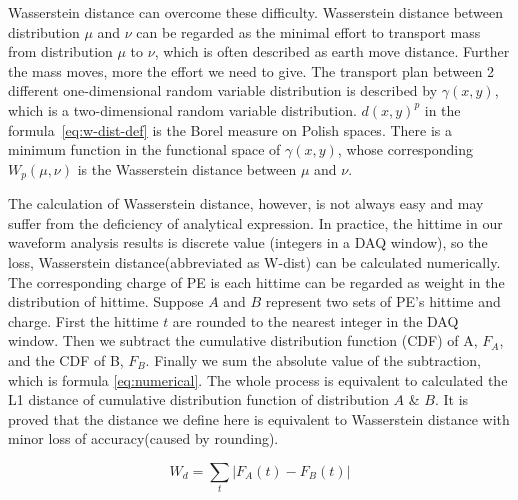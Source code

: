 Wasserstein distance can overcome these difficulty. Wasserstein distance between distribution $\mu$ and $\nu$ can be regarded as the minimal effort to transport mass from distribution $\mu$ to $\nu$, which is often described as earth move distance. Further the mass moves, more the effort we need to give. The transport plan between 2 different one-dimensional random variable distribution is described by $\gamma(x, y)$, which is a two-dimensional random variable distribution. $d(x,y)^{p}$ in the formula~\eqref{eq:w-dist-def} is the Borel measure on Polish spaces\cite{villani_2009}. There is a minimum function in the functional space of $\gamma(x, y)$, whose corresponding $W_{p}(\mu,\nu)$ is the Wasserstein distance between $\mu$ and $\nu$. 

The calculation of Wasserstein distance, however, is not always easy and may suffer from the deficiency of analytical expression. In practice, the hittime in our waveform analysis results is discrete value (integers in a DAQ window), so the loss, Wasserstein distance(abbreviated as W-dist) can be calculated numerically. The corresponding charge of PE is each hittime can be regarded as weight in the distribution of hittime. Suppose $A$ and $B$ represent two sets of PE's hittime and charge. First the hittime $t$ are rounded to the nearest integer in the DAQ window. Then we subtract the cumulative distribution function (CDF) of A, $F_{A}$, and the CDF of B, $F_{B}$. Finally we sum the absolute value of the subtraction, which is formula \eqref{eq:numerical}. The whole process is equivalent to calculated the L1 distance of cumulative distribution function of distribution $A$ \& $B$. It is proved that the distance we define here is equivalent to Wasserstein distance with minor loss of accuracy(caused by rounding). 

\begin{equation}
    W_{d} = \sum_t|F_{A}(t) - F_{B}(t)|
    \label{eq:numerical}
\end{equation}
